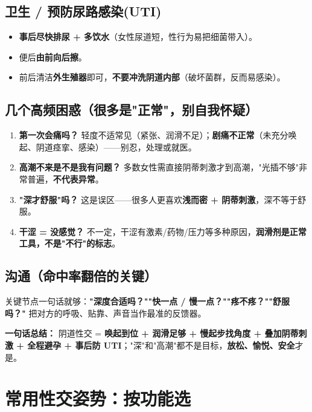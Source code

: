 \documentclass[12pt,UTF8,openany]{ctexbook}
\begin{document}
\section{卫生 / 预防尿路感染(UTI)}

\begin{itemize}[leftmargin=2em,itemsep=0.3em]
  \item \textbf{事后尽快排尿 + 多饮水}（女性尿道短，性行为易把细菌带入）。
  \item 便后\textbf{由前向后擦}。
  \item 前后清洁\textbf{外生殖器}即可，\textbf{不要冲洗阴道内部}（破坏菌群，反而易感染）。
\end{itemize}

\section{几个高频困惑（很多是"正常"，别自我怀疑）}

\begin{enumerate}[leftmargin=2em,itemsep=0.3em]
  \item \textbf{第一次会痛吗？} 轻度不适常见（紧张、润滑不足）；\textbf{剧痛不正常}（未充分唤起、阴道痉挛、感染）——别忍，处理或就医。
  \item \textbf{高潮不来是不是我有问题？} 多数女性需直接阴蒂刺激才到高潮，"光插不够"非常普遍，\textbf{不代表异常}。
  \item \textbf{"深才舒服"吗？} 这是误区——很多人更喜欢\textbf{浅而密 + 阴蒂刺激}，深不等于舒服。
  \item \textbf{干涩 = 没感觉？} 不一定，干涩有激素/药物/压力等多种原因，\textbf{润滑剂是正常工具，不是"不行"的标志}。
\end{enumerate}

\section{沟通（命中率翻倍的关键）}

关键节点一句话就够：\textbf{"深度合适吗？""快一点 / 慢一点？""疼不疼？""舒服吗？"} 把对方的呼吸、贴靠、声音当作最准的反馈器。

\vspace{1em}
\noindent\textbf{一句话总结：} 阴道性交 = \textbf{唤起到位 + 润滑足够 + 慢起步找角度 + 叠加阴蒂刺激 + 全程避孕 + 事后防 UTI}；"深"和"高潮"都不是目标，\textbf{放松、愉悦、安全}才是。

\chapter{常用性交姿势：按功能选}
\label{chap:positions}
\end{document}
